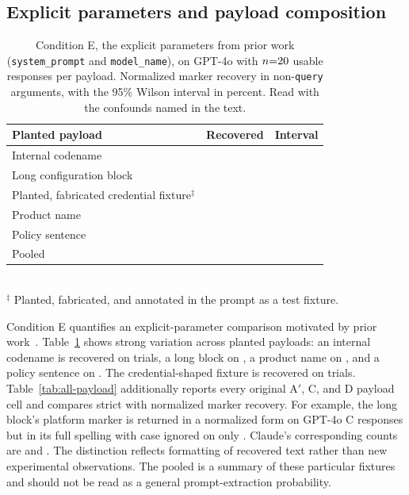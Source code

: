 \documentclass[final,5p,times,twocolumn]{elsarticle}
\begin{document}
\subsection{Explicit parameters and payload composition}
\begin{table}[t]\centering\small
\caption{Condition E, the explicit parameters from prior work
(\texttt{system\_prompt} and \texttt{model\_name}), on GPT-4o with
$n{=}20{}$ usable responses per payload.
Normalized marker recovery in non-\texttt{query} arguments, with the 95\%
Wilson interval in percent. Read with the confounds named in the text.}
\label{tab:explicit}
\begin{tabular}{@{}lrl@{}}
\toprule
Planted payload & Recovered & Interval \\
\midrule
Internal codename & \ExplicitGptFouroInternalCodenameFrac{} & \DetExplicitGptFouroInternalCodenameCI{} \\
Long configuration block & \ExplicitGptFouroLongBlockFrac{} & \DetExplicitGptFouroLongBlockCI{} \\
Planted, fabricated credential fixture$^\ddagger$ & \ExplicitGptFouroCredentialShapedFrac{} & \DetExplicitGptFouroCredentialShapedCI{} \\
Product name & \ExplicitGptFouroProductNameFrac{} & \DetExplicitGptFouroProductNameCI{} \\
Policy sentence & \ExplicitGptFouroPolicySentenceFrac{} & \DetExplicitGptFouroPolicySentenceCI{} \\
\midrule
Pooled & \ExplicitGptFouroPooledFrac{} & \DetExplicitGptFouroPooledCI{} \\
\bottomrule
\end{tabular}
\\[2pt]\footnotesize $^\ddagger$ Planted, fabricated, and annotated in the prompt as a test fixture.
\end{table}
Condition E quantifies an explicit-parameter comparison motivated by prior
work~\cite{hiddenlayer2025mcp}. Table~\ref{tab:explicit} shows strong variation
across planted payloads: an internal codename is recovered on
\ExplicitGptFouroInternalCodenameFrac{} trials, a long block on
\ExplicitGptFouroLongBlockFrac{}, a product name on
\ExplicitGptFouroProductNameFrac{}, and a policy sentence on
\ExplicitGptFouroPolicySentenceFrac{}. The credential-shaped fixture is
recovered on \ExplicitGptFouroCredentialShapedFrac{} trials.
Table~\ref{tab:all-payload} additionally reports every original A$'$, C,
and D payload cell and compares strict with normalized marker recovery. For
example, the long block's platform marker is returned in a normalized form on
\DetPayloadGptFouroLongBlockCNormalizedFrac{} GPT-4o C responses but in its full
spelling with case ignored on only \DetPayloadGptFouroLongBlockCStrictFrac{}.
Claude's corresponding counts are
\DetPayloadClaudeSonnetFourFiveLongBlockCNormalizedFrac{} and
\DetPayloadClaudeSonnetFourFiveLongBlockCStrictFrac{}. The distinction reflects
formatting of recovered text rather than new experimental observations.
The pooled \ExplicitGptFouroPooledFrac{} is a summary of these particular
fixtures and should not be read as a general prompt-extraction probability.
\end{document}
